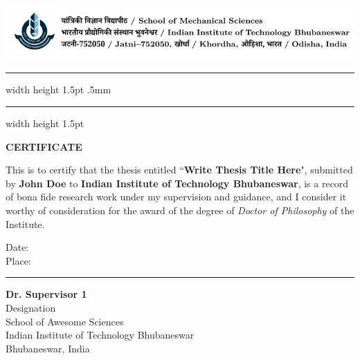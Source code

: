 
\chapter*{}
\vspace{-1cm} %


{\centering \includegraphics[width=\linewidth, scale=1]{iitbbs_letterhead}}
{\hrule width \hsize height 1.5pt \kern .5mm \hrule width \hsize height 1.5pt}

\vspace*{2ex}
\begin{center}
\textbf{\Large CERTIFICATE}
\end{center}

\par This is to certify that the thesis entitled ``\textbf{Write Thesis Title Here}", submitted by \textbf{John Doe} to \textbf{Indian Institute of Technology Bhubaneswar}, is a record of bona fide research work under my supervision and guidance, and I consider it worthy of consideration for the award of the degree of \textit{Doctor of Philosophy} of the Institute.

\vspace{4em}
\noindent
\begin{minipage}[t]{0.35\textwidth}
    Date: \\
    Place:
\end{minipage}%
\hfill
\noindent
\begin{minipage}[t]{0.55\textwidth}
    \raggedleft
    \hrule\vspace{2ex}
    \textbf{Dr. Supervisor 1} \\
	Designation \\
	School of Awesome Sciences \\
	Indian Institute of Technology Bhubaneswar \\
	Bhubaneswar, India \\
	
\end{minipage}


\newpage
\thispagestyle{empty}
\null\newpage
